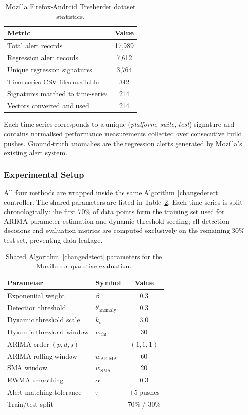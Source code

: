 \documentclass[pdflatex,sn-nature]{sn-jnl}%
\theoremstyle{thmstyleone}%
\theoremstyle{thmstyletwo}%
\theoremstyle{thmstylethree}%
\begin{document}
\begin{table}[tbp]
\centering
\begin{tabular}{|l|c|}
\hline
\textbf{Metric} & \textbf{Value} \\
\hline
Total alert records & 17{,}989 \\
Regression alert records & 7{,}612 \\
Unique regression signatures & 3{,}764 \\
Time-series CSV files available & 342 \\
Signatures matched to time-series & 214 \\
Vectors converted and used & 214 \\
\hline
\end{tabular}
\caption{Mozilla Firefox-Android Treeherder dataset statistics.}
\label{tab:mozilla_dataset}
\end{table}

Each time series corresponds to a unique (\textit{platform, suite, test}) signature and contains normalised performance measurements collected over consecutive build pushes. Ground-truth anomalies are the regression alerts generated by Mozilla's existing alert system.

\subsubsection{Experimental Setup}
All four methods are wrapped inside the same Algorithm~\ref{changedetect} controller. The shared parameters are listed in Table~\ref{tab:mozilla_params}. Each time series is split chronologically: the first 70\% of data points form the training set used for ARIMA parameter estimation and dynamic-threshold seeding; all detection decisions and evaluation metrics are computed exclusively on the remaining 30\% test set, preventing data leakage.

\begin{table}[tbp]
\centering
\begin{tabular}{|l|l|c|}
\hline
\textbf{Parameter} & \textbf{Symbol} & \textbf{Value} \\
\hline
Exponential weight & $\beta$ & 0.3 \\
Detection threshold & $\theta_{\text{anomaly}}$ & 0.3 \\
Dynamic threshold scale & $k_\sigma$ & 3.0 \\
Dynamic threshold window & $w_{\text{thr}}$ & 30 \\
ARIMA order $(p,d,q)$ & --- & $(1,1,1)$ \\
ARIMA rolling window & $w_{\text{ARIMA}}$ & 60 \\
SMA window & $w_{\text{SMA}}$ & 20 \\
EWMA smoothing & $\alpha$ & 0.3 \\
Alert matching tolerance & $\tau$ & $\pm 5$ pushes \\
Train/test split & --- & 70\% / 30\% \\
\hline
\end{tabular}
\caption{Shared Algorithm~\ref{changedetect} parameters for the Mozilla comparative evaluation.}
\label{tab:mozilla_params}
\end{table}
\end{document}
